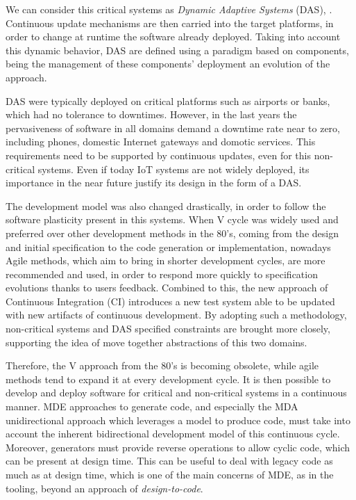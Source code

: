 We can consider this critical systems as \textit{Dynamic Adaptive Systems} (DAS)\cite{mckinley2004composing}, \cite{morin2009taming}.
Continuous update mechanisms are then carried into the target platforms, in order to change at runtime the software already deployed.
Taking into account this dynamic behavior, DAS are defined using a paradigm based on components, being the management of these components' deployment an evolution of the approach. %

DAS were typically deployed on critical platforms such as airports or banks, which had no tolerance to downtimes.
However, in the last years the pervasiveness of software in all domains demand a downtime rate near to zero, including phones, domestic Internet gateways and domotic services\cite{nain2008using}.
This requirements need to be supported by continuous updates, even for this non-critical systems.
Even if today IoT systems are not widely deployed, its importance in the near future justify its design in the form of a DAS.

The development model was also changed drastically, in order to follow the software plasticity present in this systems.
When V cycle was widely used and preferred over other development methods in the 80's, coming from the design and initial specification to the code generation or implementation, nowadays Agile methods\cite{stolberg2009enabling}, which aim to bring in shorter development cycles, are more recommended and used, in order to respond more quickly to specification evolutions thanks to users feedback.
Combined to this, the new approach of Continuous Integration (CI) introduces a new test system able to be updated with new artifacts of continuous development.
By adopting such a methodology, non-critical systems and DAS specified constraints are brought more closely, supporting the idea of move together abstractions of this two domains.

Therefore, the V approach from the 80's is becoming obsolete, while agile methods tend to expand it at every development cycle.
It is then possible to develop and deploy software for critical and non-critical systems in a continuous manner.
MDE approaches to generate code, and especially the MDA unidirectional approach which leverages a model to produce code, must take into account the inherent bidirectional development model of this continuous cycle.
Moreover, generators must provide reverse operations to allow cyclic code, which can be present at design time.
This can be useful to deal with legacy code as much as at design time, which is one of the main concerns of MDE, as in the tooling, beyond an approach of \textit{design-to-code}.

